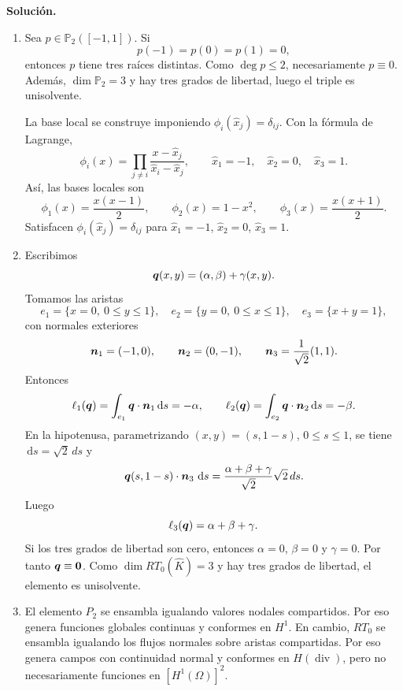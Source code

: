 \documentclass[11pt]{article}
\def\vec   #1{\mbox{\boldmath $#1$}{}}
\DeclareMathOperator{\dive}{div}
\def\ds{\mbox{\(\,\mathrm{d}s\)}}
\begin{document}
\begin{enumerate}[label=\textbf{\arabic*.}, leftmargin=*]
    \textbf{Solución.}
    \begin{enumerate}[label=(\alph*)]
        \item Sea $p\in\mathbb P_2([-1,1])$. Si
        \[
            p(-1)=p(0)=p(1)=0,
        \]
        entonces $p$ tiene tres raíces distintas. Como $\deg p\le2$, necesariamente $p\equiv0$. Además, $\dim\mathbb P_2=3$ y hay tres grados de libertad, luego el triple es unisolvente.

        La base local se construye imponiendo $\phi_i(\widehat x_j)=\delta_{ij}$. Con la fórmula de Lagrange,
        \[
            \phi_i(x)=\prod_{j\neq i}
            \frac{x-\widehat x_j}{\widehat x_i-\widehat x_j},
            \qquad
            \widehat x_1=-1,\quad \widehat x_2=0,\quad \widehat x_3=1.
        \]
        Así, las bases locales son
        \[
            \phi_1(x)=\frac{x(x-1)}{2},
            \qquad
            \phi_2(x)=1-x^2,
            \qquad
            \phi_3(x)=\frac{x(x+1)}{2}.
        \]
        Satisfacen $\phi_i(\widehat x_j)=\delta_{ij}$ para $\widehat x_1=-1$, $\widehat x_2=0$, $\widehat x_3=1$.

        \item Escribimos
        \[
            \vec q(x,y)=(\alpha,\beta)+\gamma(x,y).
        \]
        Tomamos las aristas
        \[
            e_1=\{x=0,\ 0\le y\le1\},\quad
            e_2=\{y=0,\ 0\le x\le1\},\quad
            e_3=\{x+y=1\},
        \]
        con normales exteriores
        \[
            \vec n_1=(-1,0),\qquad
            \vec n_2=(0,-1),\qquad
            \vec n_3=\frac{1}{\sqrt2}(1,1).
        \]
        Entonces
        \[
            \ell_1(\vec q)=\int_{e_1}\vec q\cdot\vec n_1\ds=-\alpha,
            \qquad
            \ell_2(\vec q)=\int_{e_2}\vec q\cdot\vec n_2\ds=-\beta.
        \]
        En la hipotenusa, parametrizando $(x,y)=(s,1-s)$, $0\le s\le1$, se tiene $\ds=\sqrt2\,ds$ y
        \[
            \vec q(s,1-s)\cdot\vec n_3\,\ds
            =
            \frac{\alpha+\beta+\gamma}{\sqrt2}\sqrt2\,ds.
        \]
        Luego
        \[
            \ell_3(\vec q)=\alpha+\beta+\gamma.
        \]
        Si los tres grados de libertad son cero, entonces $\alpha=0$, $\beta=0$ y $\gamma=0$. Por tanto $\vec q\equiv\vec0$. Como $\dim RT_0(\widehat K)=3$ y hay tres grados de libertad, el elemento es unisolvente.

        \item El elemento $P_2$ se ensambla igualando valores nodales compartidos. Por eso genera funciones globales continuas y conformes en $H^1$. En cambio, $RT_0$ se ensambla igualando los flujos normales sobre aristas compartidas. Por eso genera campos con continuidad normal y conformes en $H(\dive)$, pero no necesariamente funciones en $[H^1(\Omega)]^2$.
    \end{enumerate}


\end{enumerate}
\end{document}
